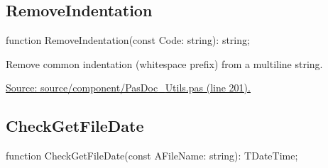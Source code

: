 \documentclass{report}
\newif\ifpdf
\begin{document}
\subsection*{RemoveIndentation}
\fi
\label{PasDoc_Utils-RemoveIndentation}
\begin{list}{}{
\setlength{\itemindent}{0cm}
\setlength{\listparindent}{0cm}
\setlength{\leftmargin}{\evensidemargin}
\addtolength{\leftmargin}{\tmplength}
\settowidth{\labelsep}{X}
\addtolength{\leftmargin}{\labelsep}
\setlength{\labelwidth}{\tmplength}
}
\item[\textbf{Declaration}\hfill]
\ifpdf
\begin{flushleft}
\fi
\begin{ttfamily}
function RemoveIndentation(const Code: string): string;\end{ttfamily}

\ifpdf
\end{flushleft}
\fi

\par
\item[\textbf{Description}]
Remove common indentation (whitespace prefix) from a multiline string.\par
\href{https://github.com/pasdoc/pasdoc/blob/master/source/component/PasDoc_Utils.pas#L201}{Source: source/component/PasDoc{\_}Utils.pas (line 201).}

\end{list}
\ifpdf
\subsection*{\large{\textbf{CheckGetFileDate}}\normalsize\hspace{1ex}\hrulefill}
\else
\subsection*{CheckGetFileDate}
\fi
\label{PasDoc_Utils-CheckGetFileDate}
\begin{list}{}{
\setlength{\itemindent}{0cm}
\setlength{\listparindent}{0cm}
\setlength{\leftmargin}{\evensidemargin}
\addtolength{\leftmargin}{\tmplength}
\settowidth{\labelsep}{X}
\addtolength{\leftmargin}{\labelsep}
\setlength{\labelwidth}{\tmplength}
}
\item[\textbf{Declaration}\hfill]
\ifpdf
\begin{flushleft}
\fi
\begin{ttfamily}
function CheckGetFileDate(const AFileName: string): TDateTime;\end{ttfamily}

\ifpdf
\end{flushleft}
\fi

\end{list}
\ifpdf
\end{document}
